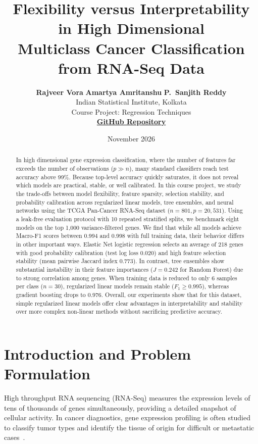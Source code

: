 \documentclass[11pt,a4paper]{article}
\title{\textbf{Flexibility versus Interpretability in High Dimensional\\Multiclass Cancer Classification from RNA-Seq Data}}
\author{
    \textbf{Rajveer Vora} \qquad \textbf{Amartya Amritanshu} \qquad \textbf{P.\ Sanjith Reddy} \\[0.6em]
    Indian Statistical Institute, Kolkata \\[0.25em]
    \small Course Project: Regression Techniques \\[0.35em]
    \small \href{https://github.com/RajveerVoraUni/gene-expression-cancer}{\textbf{GitHub Repository}}
}
\date{November 2026}
\begin{document}
\maketitle

\begin{abstract}
In high dimensional gene expression classification, where the number of features far exceeds the number of observations ($p \gg n$), many standard classifiers reach test accuracy above 99\%. Because top-level accuracy quickly saturates, it does not reveal which models are practical, stable, or well calibrated. In this course project, we study the trade-offs between model flexibility, feature sparsity, selection stability, and probability calibration across regularized linear models, tree ensembles, and neural networks using the TCGA Pan-Cancer RNA-Seq dataset ($n = 801, p = 20{,}531$). Using a leak-free evaluation protocol with 10 repeated stratified splits, we benchmark eight models on the top 1,000 variance-filtered genes. We find that while all models achieve Macro-F1 scores between 0.994 and 0.998 with full training data, their behavior differs in other important ways. Elastic Net logistic regression selects an average of 218 genes with good probability calibration (test log loss $0.020$) and high feature selection stability (mean pairwise Jaccard index $0.773$). In contrast, tree ensembles show substantial instability in their feature importances ($J = 0.242$ for Random Forest) due to strong correlation among genes. When training data is reduced to only 6 samples per class ($n = 30$), regularized linear models remain stable ($F_1 \ge 0.995$), whereas gradient boosting drops to $0.976$. Overall, our experiments show that for this dataset, simple regularized linear models offer clear advantages in interpretability and stability over more complex non-linear methods without sacrificing predictive accuracy.
\end{abstract}

\section{Introduction and Problem Formulation}

High throughput RNA sequencing (RNA-Seq) measures the expression levels of tens of thousands of genes simultaneously, providing a detailed snapshot of cellular activity. In cancer diagnostics, gene expression profiling is often studied to classify tumor types and identify the tissue of origin for difficult or metastatic cases~\cite{weinstein2013cancer}. 
\end{document}
